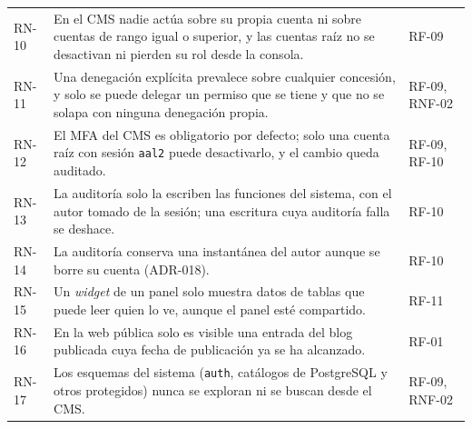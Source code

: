 {\begin{longtable}{@{}l>{\raggedright\arraybackslash}p{11.4cm}l@{}}
  RN-10 & En el CMS nadie actúa sobre su propia cuenta ni sobre cuentas de rango igual o superior, y las cuentas raíz no se desactivan ni pierden su rol desde la consola. & RF-09 \\
  RN-11 & Una denegación explícita prevalece sobre cualquier concesión, y solo se puede delegar un permiso que se tiene y que no se solapa con ninguna denegación propia. & RF-09, RNF-02 \\
  RN-12 & El MFA del CMS es obligatorio por defecto; solo una cuenta raíz con sesión \texttt{aal2} puede desactivarlo, y el cambio queda auditado. & RF-09, RF-10 \\
  RN-13 & La auditoría solo la escriben las funciones del sistema, con el autor tomado de la sesión; una escritura cuya auditoría falla se deshace. & RF-10 \\
  RN-14 & La auditoría conserva una instantánea del autor aunque se borre su cuenta (ADR-018). & RF-10 \\
  RN-15 & Un \textit{widget} de un panel solo muestra datos de tablas que puede leer quien lo ve, aunque el panel esté compartido. & RF-11 \\
  RN-16 & En la web pública solo es visible una entrada del blog publicada cuya fecha de publicación ya se ha alcanzado. & RF-01 \\
  RN-17 & Los esquemas del sistema (\texttt{auth}, catálogos de PostgreSQL y otros protegidos) nunca se exploran ni se buscan desde el CMS. & RF-09, RNF-02 \\
\end{longtable}}
